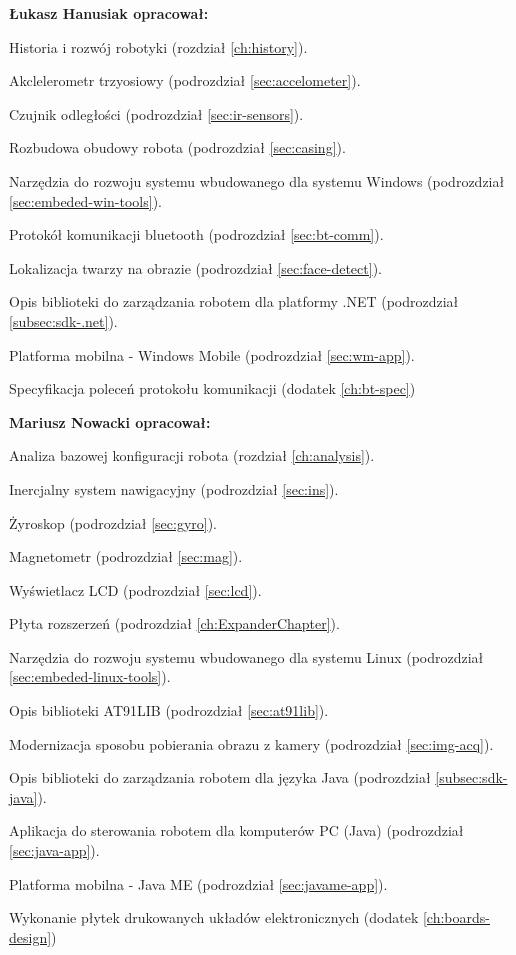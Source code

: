\documentclass[a4paper,12pt, oneside]{mwbk}
\newenvironment{item-list}
{\begin{itemize}
  \setlength{\itemsep}{0mm}
  \setlength{\parskip}{0pt}
  \setlength{\parsep}{1pt}}
{\end{itemize}}
\begin{document}
\textbf{Łukasz Hanusiak opracował:}
\begin{item-list}
  \item Historia i rozwój robotyki (rozdział \ref{ch:history}).
  \item Akclelerometr trzyosiowy (podrozdział \ref{sec:accelometer}).
  \item Czujnik odległości (podrozdział \ref{sec:ir-sensors}).
  \item Rozbudowa obudowy robota (podrozdział \ref{sec:casing}).
  \item Narzędzia do rozwoju systemu wbudowanego dla systemu Windows
  (podrozdział \ref{sec:embeded-win-tools}).
  \item Protokół komunikacji bluetooth (podrozdział \ref{sec:bt-comm}).
  \item Lokalizacja twarzy na obrazie (podrozdział \ref{sec:face-detect}).
  \item Opis biblioteki do zarządzania robotem dla platformy .NET (podrozdział
  \ref{subsec:sdk-.net}).
  \item Platforma mobilna - Windows Mobile (podrozdział \ref{sec:wm-app}).
  \item Specyfikacja poleceń protokołu komunikacji (dodatek \ref{ch:bt-spec})
\end{item-list}

\textbf{Mariusz Nowacki opracował:}
\begin{item-list}
  \item Analiza bazowej konfiguracji robota (rozdział \ref{ch:analysis}).
  \item Inercjalny system nawigacyjny (podrozdział \ref{sec:ins}).
  \item Żyroskop (podrozdział \ref{sec:gyro}).
  \item Magnetometr (podrozdział \ref{sec:mag}).
  \item Wyświetlacz LCD (podrozdział \ref{sec:lcd}).
  \item Płyta rozszerzeń (podrozdział \ref{ch:ExpanderChapter}).
  \item Narzędzia do rozwoju systemu wbudowanego dla systemu Linux (podrozdział
  \ref{sec:embeded-linux-tools}).
  \item Opis biblioteki AT91LIB (podrozdział \ref{sec:at91lib}).
  \item Modernizacja sposobu pobierania obrazu z kamery (podrozdział
  \ref{sec:img-acq}).
  \item Opis biblioteki do zarządzania robotem dla języka Java (podrozdział
  \ref{subsec:sdk-java}).
  \item Aplikacja do sterowania robotem dla komputerów PC (Java) (podrozdział
  \ref{sec:java-app}).
  \item Platforma mobilna - Java ME (podrozdział \ref{sec:javame-app}).
  \item Wykonanie płytek drukowanych układów elektronicznych (dodatek \ref{ch:boards-design})
\end{item-list}
\end{document}
